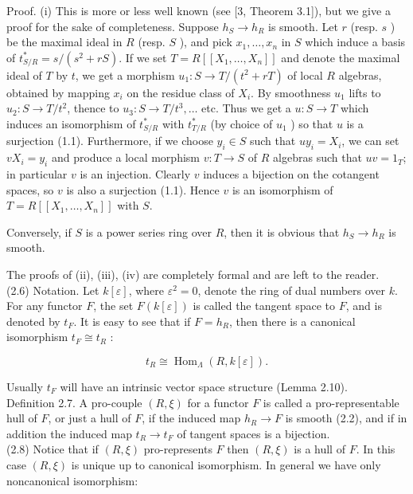 \documentclass[10pt]{article}
\begin{document}
Proof. (i) This is more or less well known (see [3, Theorem 3.1]), but we give a proof for the sake of completeness. Suppose $h_{S} \rightarrow h_{R}$ is smooth. Let $r$ (resp. $s$ ) be the maximal ideal in $R$ (resp. $S$ ), and pick $x_{1}, \ldots, x_{n}$ in $S$ which induce a basis of $t_{S / R}^{*}=s /\left(s^{2}+r S\right)$. If we set $T=R\left[\left[X_{1}, \ldots, X_{n}\right]\right]$ and denote the maximal ideal of $T$ by $t$, we get a morphism $u_{1}: S \rightarrow T /\left(t^{2}+r T\right)$ of local $R$ algebras, obtained by mapping $x_{i}$ on the residue class of $X_{i}$. By smoothness $u_{1}$ lifts to $u_{2}: S \rightarrow T / t^{2}$, thence to $u_{3}: S \rightarrow T / t^{3}, \ldots$ etc. Thus we get a $u: S \rightarrow T$ which induces an isomorphism of $t_{S / R}^{*}$ with $t_{T / R}^{*}$ (by choice of $u_{1}$ ) so that $u$ is a surjection (1.1). Furthermore, if we choose $y_{i} \in S$ such that $u y_{i}=X_{i}$, we can set $v X_{i}=y_{i}$ and produce a local morphism $v: T \rightarrow S$ of $R$ algebras such that $u v=1_{T}$; in particular $v$ is an injection. Clearly $v$ induces a bijection on the cotangent spaces, so $v$ is also a surjection (1.1). Hence $v$ is an isomorphism of $T=R\left[\left[X_{1}, \ldots, X_{n}\right]\right]$ with $S$.

Conversely, if $S$ is a power series ring over $R$, then it is obvious that $h_{S} \rightarrow h_{R}$ is smooth.

The proofs of (ii), (iii), (iv) are completely formal and are left to the reader.\\
(2.6) Notation. Let $k[\varepsilon]$, where $\varepsilon^{2}=0$, denote the ring of dual numbers over $k$. For any functor $F$, the set $F(k[\varepsilon])$ is called the tangent space to $F$, and is denoted by $t_{F}$. It is easy to see that if $F=h_{R}$, then there is a canonical isomorphism $t_{F} \cong t_{R}$ :

$$
t_{R} \cong \operatorname{Hom}_{\Lambda}(R, k[\varepsilon]) .
$$

Usually $t_{F}$ will have an intrinsic vector space structure (Lemma 2.10).\\
Definition 2.7. A pro-couple $(R, \xi)$ for a functor $F$ is called a pro-representable hull of $F$, or just a hull of $F$, if the induced map $h_{R} \rightarrow F$ is smooth (2.2), and if in addition the induced map $t_{R} \rightarrow t_{F}$ of tangent spaces is a bijection.\\
(2.8) Notice that if $(R, \xi)$ pro-represents $F$ then $(R, \xi)$ is a hull of $F$. In this case $(R, \xi)$ is unique up to canonical isomorphism. In general we have only noncanonical isomorphism:
\end{document}
